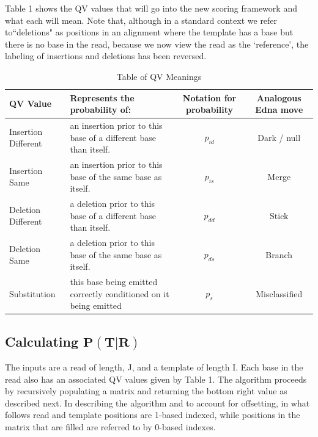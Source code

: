 \documentclass[fleqn,10pt]{SelfArx} %
\begin{document}
Table 1 shows the QV values that will go into the new scoring framework and what each will mean.  Note that, although in a standard context we refer to``deletions" as positions in an alignment where the template has a base but there is no base in the read, because we now view the read as the `reference', the labeling of insertions and deletions has been reversed.

\begin{table}[bt]
\caption{Table of QV Meanings}
\centering
    \begin{tabular}{| l | p{7cm} | c | c |  }
    \toprule
    \hline
    \textbf{QV Value} &  \textbf{Represents the probability of:} &  \textbf{Notation for probability} &  \textbf{Analogous Edna move}  \\ \hline \hline
    Insertion Different & an insertion prior to this base of a different base than itself. & $p_{id}$  & Dark / null \\ \hline
    Insertion Same & an insertion prior to this base of the same base as itself.& $p_{is}$ & Merge \\ \hline
    Deletion Different & a deletion prior to this base of a different base than itself. & $p_{dd}$  & Stick \\ \hline
    Deletion Same & a deletion prior to this base of the same base as itself. & $p_{ds}$  & Branch \\ \hline
    Substitution & this base being emitted correctly conditioned on it being emitted & $p_{s}$  &  Misclassified \\ \hline
    \bottomrule
    \end{tabular}
\end{table}





\subsection{ Calculating $\mathbf{P(T|R)}$} 

The inputs are a read of length, J, and a template of length I.  Each base in the read also has an associated QV values given by Table 1.   The algorithm proceeds by recursively populating a matrix and returning the bottom right value as described next.  In describing the algorithm and to account for offsetting, in what follows read and template positions are 1-based indexed, while positions in the matrix that are filled are referred to by 0-based indexes. 
\end{document}
